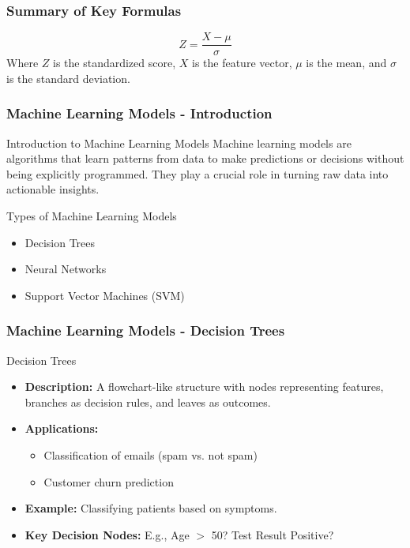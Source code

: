 \documentclass[aspectratio=169]{beamer}
\begin{document}
\begin{frame}[fragile]
    \frametitle{Summary of Key Formulas}
    \begin{equation}
    Z = \frac{X - \mu}{\sigma}
    \end{equation}
    Where $Z$ is the standardized score, $X$ is the feature vector, $\mu$ is the mean, and $\sigma$ is the standard deviation.
\end{frame}

\begin{frame}[fragile]
  \frametitle{Machine Learning Models - Introduction}
  
  \begin{block}{Introduction to Machine Learning Models}
    Machine learning models are algorithms that learn patterns from data to make predictions or decisions without being explicitly programmed. They play a crucial role in turning raw data into actionable insights.
  \end{block}
  
  \begin{block}{Types of Machine Learning Models}
    \begin{itemize}
      \item Decision Trees
      \item Neural Networks
      \item Support Vector Machines (SVM)
    \end{itemize}
  \end{block}
\end{frame}

\begin{frame}[fragile]
  \frametitle{Machine Learning Models - Decision Trees}
  
  \begin{block}{Decision Trees}
    \begin{itemize}
      \item \textbf{Description:} A flowchart-like structure with nodes representing features, branches as decision rules, and leaves as outcomes.
      \item \textbf{Applications:} 
        \begin{itemize}
          \item Classification of emails (spam vs. not spam)
          \item Customer churn prediction
        \end{itemize}
      \item \textbf{Example:} Classifying patients based on symptoms.
      \item \textbf{Key Decision Nodes:} E.g., Age $>$ 50? Test Result Positive?
    \end{itemize}
  \end{block}
\end{frame}
\end{document}
